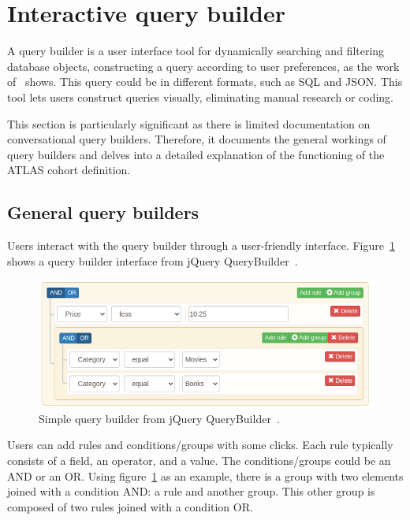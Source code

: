 

\section{Interactive query builder}

A query builder is a user interface tool for dynamically searching and filtering database objects, constructing a query according to user preferences, as the work of~\citet{mussa_forestqb_2022} shows. This query could be in different formats, such as SQL and JSON. This tool lets users construct queries visually, eliminating manual research or coding. 

This section is particularly significant as there is limited documentation on conversational query builders. Therefore, it documents the general workings of query builders and delves into a detailed explanation of the functioning of the ATLAS cohort definition.

\subsection{General query builders}


Users interact with the query builder through a user-friendly interface. Figure~\ref{fig_query_builder} shows a query builder interface from jQuery QueryBuilder~\cite{noauthor_jquery_nodate}.

\begin{figure}[H]
    \includegraphics[width=\textwidth]{figs/chapter2/querybuilder.png}
    \centering
    \caption[Simple query builder example]{Simple query builder from jQuery QueryBuilder~\cite{noauthor_jquery_nodate}.}
    \label{fig_query_builder}
\end{figure}

Users can add rules and conditions/groups with some clicks. Each rule typically consists of a field, an operator, and a value. The conditions/groups could be an AND or an OR. Using figure~\ref{fig_query_builder} as an example, there is a group with two elements joined with a condition AND: a rule and another group. This other group is composed of two rules joined with a condition OR.

